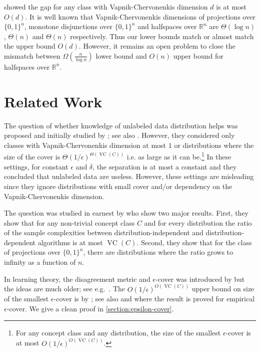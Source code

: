 \documentclass[10pt]{article}
\newcommand{\R}{\mathbb{R}}
\DeclareMathOperator{\VC}{VC}
\begin{document}
\cite{Darnstadt-Simon-Szorenyi-2013} showed the gap for any class with
Vapnik-Chervonenkis dimension $d$ is at most $O(d)$. It is well known that
Vapnik-Chervonenkis dimensions of projections over $\{0,1\}^n$, monotone
disjunctions over $\{0,1\}^n$ and halfspaces over $\R^n$ are $\Theta(\log n)$,
$\Theta(n)$ and $\Theta(n)$ respectively. Thus our lower bounds match or almost
match the upper bound $O(d)$. However, it remains an open problem to close the
mismatch between $\Omega(\frac{n}{\log n})$ lower bound and $O(n)$ upper bound
for halfspaces over $\R^n$.

\section{Related Work}

The question of whether knowledge of unlabeled data distribution helps was
proposed and initially studied by \cite{Ben-David-Lu-Pal-2008}; see also
\cite{Lu-2009}. However, they considered only classes with Vapnik-Chervonenkis
dimension at most $1$ or distributions where the size of the cover is
$\Theta(1/\epsilon)^{\Theta(\VC(C))}$ i.e. as large as it can be.\footnote{For
any concept class and any distribution, the size of the smallest
$\epsilon$-cover is at most $O(1/\epsilon)^{O(\VC(C))}$.} In these settings, for
constant $\epsilon$ and $\delta$, the separation is at most a constant and they
concluded that unlabeled data are useless. However, these settings are
misleading since they ignore distributions with small cover and/or dependency on
the Vapnik-Chervonenkis dimension.

The question was studied in earnest by \cite{Darnstadt-Simon-Szorenyi-2013} who
show two major results. First, they show that for any non-trivial concept class
$C$ and for every distribution the ratio of the sample complexities between
distribution-independent and distribution-dependent algorithms is at most
$\VC(C)$. Second, they show that for the class of projections over $\{0,1\}^n$,
there are distributions where the ratio grows to infinity as a function of $n$.

In learning theory, the disagreement metric and $\epsilon$-cover was  introduced
by \cite{Benedek-Itai-1991} but the ideas are much older; see
e.g.~\cite{Dudley-1978, Dudley-1984}. The $O(1/\epsilon)^{O(\VC(C))}$ upper
bound on size of the smallest $\epsilon$-cover is by \citet[Lemma
7.13]{Dudley-1978}; see also \citet[Chapter 4]{Devroye-Lugosi-2000} and
\cite{Haussler-1995} where the result is proved for empirical $\epsilon$-cover.
We give a clean proof in \autoref{section:epsilon-cover}.
\end{document}
